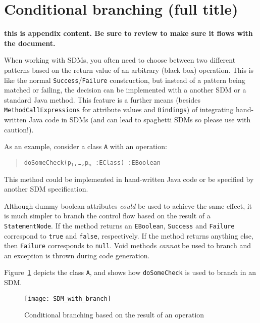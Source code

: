 \newpage
\section{Conditional branching (full title)}
\genHeader
\hypertarget{sec:conBran}{}

{\bf \large this is appendix content. Be sure to review to make sure it flows with the document.}

When working with SDMs, you often need to choose between two different patterns based on the return value of an arbitrary (black box) operation.
This is like the normal \texttt{Success}/\texttt{Failure} construction, but instead of a pattern being matched or failing, the decision can be implemented with
a another SDM or a standard Java method. This feature is a further means (besides \texttt{MethodCallExpressions} for attribute values and \texttt{Bindings}) of
integrating hand-written Java code in SDMs (and can lead to spaghetti SDMs so please use with caution!).

As an example, consider a class \texttt{A} with an operation:
\begin{quote}
 \mbox{\texttt{doSomeCheck(p$_1$,\ldots,p$_n$ :EClass) :EBoolean}}
\end{quote}

This method could be implemented in hand-written Java code or be specified by another SDM specification.

Although dummy boolean attributes \emph{could} be used to achieve the same effect, it is much simpler to branch the control flow based on the result of a \texttt{StatementNode}.
If the method returns an \texttt{EBoolean}, \texttt{Success} and \texttt{Failure} correspond to \texttt{true} and \texttt{false}, respectively. If the method returns anything else, then \texttt{Failure} corresponds to \texttt{null}. Void methods \emph{cannot} be used to branch and an exception is thrown during code generation.

Figure~\ref{fig:cond_branch_on_op} depicts the class \texttt{A}, and shows how \texttt{doSomeCheck} is used to branch in an SDM.

\begin{figure}[htp]
\begin{center}
  \texttt{[image: SDM\_with\_branch]}
  \caption{Conditional branching based on the result of an operation}
  \label{fig:cond_branch_on_op}
\end{center}
\end{figure}

